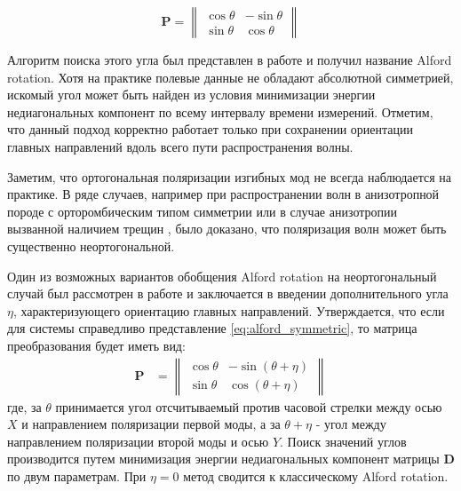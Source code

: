 \documentclass[a4paper,11pt]{article}
\begin{document}
\begin{equation*}
	\mathbf{P} = \left\|
	\begin{array}{cc}
	\cos \theta &-\sin \theta \\ 
	\sin \theta & \cos \theta
	\end{array} 
	\right\| 
\end{equation*}

Алгоритм поиска этого угла был представлен в работе \cite{Alford1986} и получил название Alford rotation. Хотя на практике полевые данные не обладают абсолютной симметрией, искомый угол может быть найден из условия минимизации энергии недиагональных компонент по всему интервалу времени измерений. Отметим, что данный подход корректно работает только при сохранении ориентации главных направлений вдоль всего пути распространения волны.

Заметим, что ортогональная поляризации изгибных мод не всегда наблюдается на практике. В ряде случаев, например при распространении волн в анизотропной породе с орторомбическим типом симметрии \cite{Dellinger2001} или в случае анизотропии вызванной наличием трещин \cite{Nolte1996}, было доказано, что поляризация волн может быть существенно неортогональной. 

Один из возможных вариантов обобщения Alford rotation на неортогональный случай был рассмотрен в работе \cite{Dellinger1998} и заключается в введении дополнительного угла $\eta$, характеризующего ориентацию главных направлений. Утверждается, что если для системы справедливо представление \eqref{eq:alford_symmetric}, то матрица преобразования будет иметь вид:
\begin{align*}
\mathbf{P} &= \left\|
\begin{array}{cc}
\cos \theta & -\sin (\theta+\eta) \\ 
\sin \theta & \cos (\theta+\eta)
\end{array} 
\right\|
\end{align*}
где, за $\theta$ принимается угол отсчитываемый против часовой стрелки между осью $X$ и направлением поляризации первой моды, а за $\theta + \eta$ - угол между направлением поляризации второй моды и осью $Y$. Поиск значений углов производится путем минимизация энергии недиагональных компонент матрицы $\mathbf{D}$ по двум параметрам. При $\eta=0$ метод сводится к классическому Alford rotation. 
\end{document}

